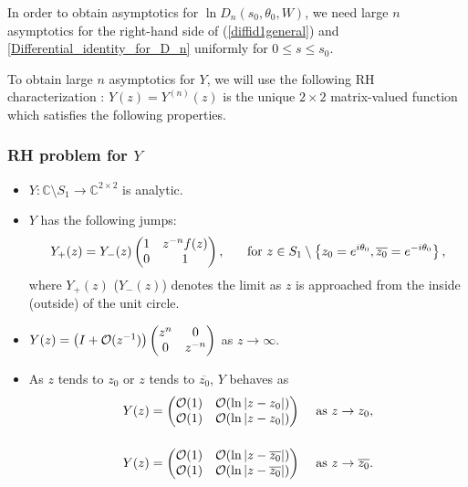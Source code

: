 \documentclass[11pt,fleqn]{article}
\numberwithin{equation}{section}
\def\bigO{{\cal O}}
\begin{document}
In order to obtain asymptotics for $\ln D_n(s_0,\theta_0,W)$, we need large $n$ asymptotics for the right-hand side of (\ref{diffid1general}) and \eqref{Differential_identity_for_D_n} uniformly for $0 \leq s \leq s_0$. 



To obtain large $n$ asymptotics for $Y$, we will use the following RH characterization \cite{FIK}:
$Y(z) = Y^{(n)}(z)$ is the unique $2 \times 2$ matrix-valued function  which satisfies the following properties. 
\subsubsection*{RH problem for $Y$}
\begin{itemize}
\item[(a)] $Y : \mathbb{C}\setminus S_{1} \to \mathbb{C}^{2\times 2}$ is analytic.
\item[(b)] $Y$ has the following jumps:
\begin{equation*}
Y_{+}(z) = Y_{-}(z) \begin{pmatrix}
1 & z^{-n}f(z) \\ 0 & 1
\end{pmatrix}, \hspace{0.5cm} \mbox{ for } z \in S_{1}\setminus \left\{z_{0}=e^{i\theta_0} ,\overline{z_{0}}=e^{-i\theta_0}\right\},
\end{equation*}
where $Y_+(z)$ ($Y_-(z)$) denotes the limit as $z$ is approached from the inside (outside) of the unit circle.
\item[(c)] $Y(z) = \left(I + \bigO(z^{-1})\right)  \begin{pmatrix}
z^{n} & 0 \\ 0 & z^{-n}
\end{pmatrix}$ as $z \to \infty$.
\item[(d)] As $z$ tends to $z_0$ or $z$ tends to $\overline{z_0}$, $Y$ behaves as
\begin{equation*}
\begin{array}{l l}
Y(z) = \begin{pmatrix}
\bigO(1) & \bigO(\ln |z-z_0|) \\ \bigO(1) & \bigO(\ln |z-z_0|)


\end{pmatrix} &  \mbox{ as } z \to z_0, \\ [0.8cm]
Y(z) = \begin{pmatrix}
\bigO(1) & \bigO(\ln |z-\overline{z_0}|) \\ \bigO(1) & \bigO(\ln |z-\overline{z_0}|)
\end{pmatrix} &  \mbox{ as } z \to \overline{z_0}.
\end{array}
\end{equation*}
\end{itemize}
\end{document}
